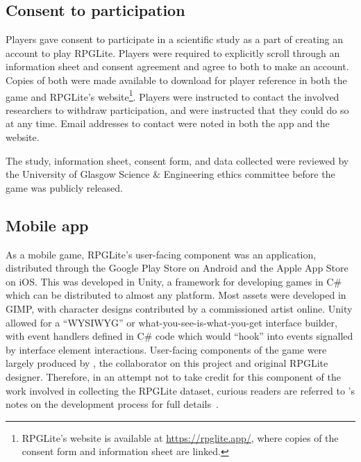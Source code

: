 \subsection{Consent to participation}\label{subsec:consent_to_participation}


Players gave consent to participate in a scientific study as a part of creating
an account to play RPGLite. Players were required to explicitly scroll through
an information sheet and consent agreement and agree to both to make an account.
Copies of both were made available to download for player reference in both the
game and RPGLite's website\footnote{RPGLite's website is available at
\href{https://rpglite.app/}{https://rpglite.app/}, where copies of the consent
form and information sheet are linked.}. Players were instructed to
contact the involved researchers to withdraw participation, and were instructed
that they could do so at any time. Email addresses to contact were noted in both
the app and the website.

The study, information sheet, consent form, and data collected were reviewed by
the University of Glasgow Science \& Engineering ethics committee before the
game was publicly released.

\subsection{Mobile app}

As a mobile game, RPGLite's user-facing component was an application,
distributed through the Google Play Store on Android and the Apple App Store on
iOS. This was developed in Unity, a framework for developing games in C\# which
can be distributed to almost any platform. Most assets were developed in GIMP, with character designs
contributed by a commissioned artist online. Unity allowed for a ``WYSIWYG'' or
what-you-see-is-what-you-get interface builder, with event handlers defined in
C\# code which would ``hook'' into events signalled by interface element
interactions. User-facing components of the game were largely produced by
\citeauthor{kavanagh2021thesis}, the collaborator on this project and original
RPGLite designer. Therefore, in an attempt not to take credit for this component
of the work involved in collecting the RPGLite dataset, curious readers are
referred to \citeauthor{kavanagh2021thesis}'s notes on the development process
for full details~\cite{kavanagh2021thesis}.

